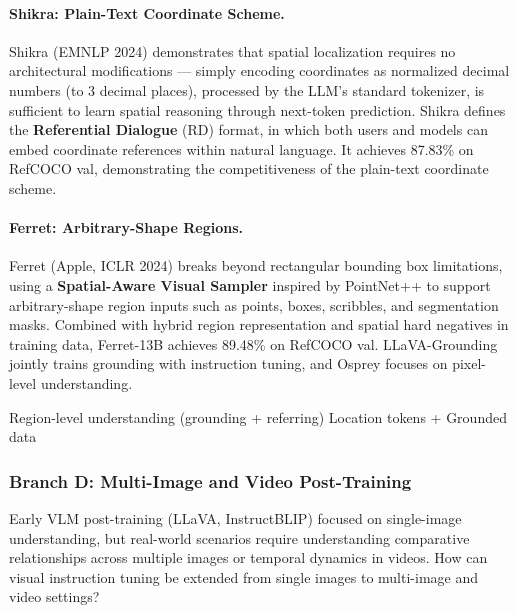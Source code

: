 \paragraph{Shikra: Plain-Text Coordinate Scheme.}
Shikra \cite{chen2023shikra} (EMNLP 2024) demonstrates that spatial localization requires no architectural modifications ---
simply encoding coordinates as normalized decimal numbers (to 3 decimal places),
processed by the LLM's standard tokenizer, is sufficient to learn spatial reasoning through next-token prediction.
Shikra defines the \textbf{Referential Dialogue} (RD) format,
in which both users and models can embed coordinate references within natural language.
It achieves 87.83\% on RefCOCO val, demonstrating the competitiveness of the plain-text coordinate scheme.

\paragraph{Ferret: Arbitrary-Shape Regions.}
Ferret \cite{you2023ferret} (Apple, ICLR 2024) breaks beyond rectangular bounding box limitations,
using a \textbf{Spatial-Aware Visual Sampler} inspired by PointNet++
to support arbitrary-shape region inputs such as points, boxes, scribbles, and segmentation masks.
Combined with hybrid region representation and spatial hard negatives in training data,
Ferret-13B achieves 89.48\% on RefCOCO val.
LLaVA-Grounding \cite{zhang2023llava-grounding} jointly trains grounding with instruction tuning,
and Osprey \cite{yuan2023osprey} focuses on pixel-level understanding.

  {Region-level understanding (grounding + referring)}
  {Location tokens + Grounded data}

\subsubsection{Branch D: Multi-Image and Video Post-Training}
\label{sec:t5-branch-d}

\begin{problembox}
Early VLM post-training (LLaVA, InstructBLIP) focused on single-image understanding,
but real-world scenarios require understanding comparative relationships across multiple images or temporal dynamics in videos.
How can visual instruction tuning be extended from single images to multi-image and video settings?
\end{problembox}

